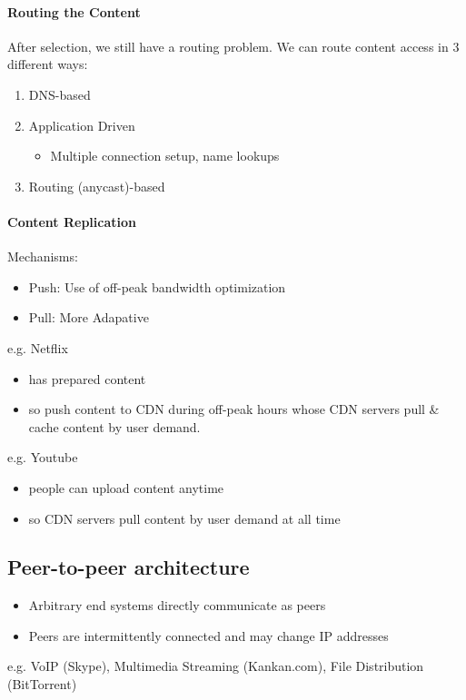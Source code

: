 \documentclass[a4paper]{article}
\begin{document}
\paragraph{Routing the Content}\mbox{}

\medskip
\noindent After selection, we still have a routing problem. We can route content access in 3 different ways:
\begin{enumerate}
    \item DNS-based
    \item Application Driven
    \begin{itemize}
        \item Multiple connection setup, name lookups
    \end{itemize}
    \item Routing (anycast)-based
\end{enumerate}

\paragraph{Content Replication}\mbox{}

\medskip
\noindent Mechanisms:
\begin{itemize}
    \item Push: Use of off-peak bandwidth optimization
    \item Pull: More Adapative
\end{itemize}
\noindent e.g. Netflix
\begin{itemize}
    \item has prepared content
    \item so push content to CDN during off-peak hours whose CDN servers pull \& cache content by user demand.
\end{itemize}
\noindent e.g. Youtube
\begin{itemize}
    \item people can upload content anytime
    \item so CDN servers pull content by user demand at all time
\end{itemize}

\subsection{Peer-to-peer architecture}
\begin{itemize}
    \item Arbitrary end systems directly communicate as peers
    \item Peers are intermittently connected and may change IP addresses
\end{itemize}
e.g. VoIP (Skype), Multimedia Streaming (Kankan.com), File Distribution (BitTorrent)
\end{document}
